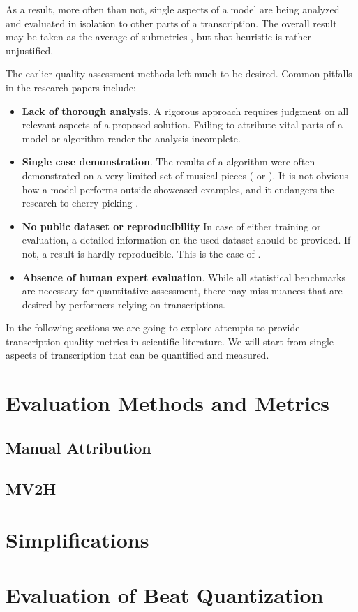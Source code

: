 As a result, more often than not, single aspects of a model are being analyzed and evaluated in isolation to other parts of a transcription. The overall result may be taken as the average of submetrics \missing, but that heuristic is rather unjustified.

The earlier quality assessment methods left much to be desired. Common pitfalls in the research papers include:\begin{itemize}
	\item {\bf Lack of thorough analysis}. A rigorous approach requires judgment on all relevant aspects of a proposed solution. Failing to attribute vital parts of a model or algorithm render the analysis incomplete.
	\item {\bf Single case demonstration}. The results of a algorithm were often demonstrated on a very limited set of musical pieces (\cite{Takeda2002} or \cite{Yang2005}). It is not obvious how a model performs outside showcased examples, and it endangers the research to cherry-picking \missing.
	\item {\bf No public dataset or reproducibility} In case of either training or evaluation, a detailed information on the used dataset should be provided. If not, a result is hardly reproducible. This is the case of \cite{Takeda2002}.
	\item {\bf Absence of human expert evaluation}. While all statistical benchmarks are necessary for quantitative assessment, there may miss nuances that are desired by performers relying on transcriptions.
\end{itemize}

In the following sections we are going to explore attempts to provide transcription quality metrics in scientific literature. We will start from single aspects of transcription that can be quantified and measured.

\section{Evaluation Methods and Metrics}

\subsection{Manual Attribution}

\subsection{MV2H}

\cite{McLeod2018}

\section{Simplifications}

\section{Evaluation of Beat Quantization}

\missing
